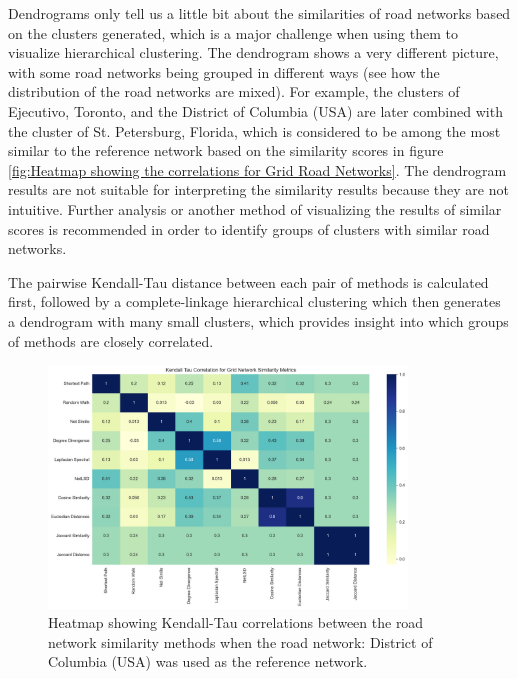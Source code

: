 Dendrograms only tell us a little bit about the similarities of road networks based on the clusters generated, which is a major challenge when using them to visualize hierarchical clustering. The dendrogram shows a very different picture, with some road networks being grouped in different ways (see how the distribution of the road networks are mixed). For example, the clusters of Ejecutivo, Toronto, and the District of Columbia (USA) are later combined with the cluster of St. Petersburg, Florida, which is considered to be among the most similar to the reference network based on the similarity scores in figure \ref{fig:Heatmap showing the correlations for Grid Road Networks}. The dendrogram results are not suitable for interpreting the similarity results because they are not intuitive. Further analysis or another method of visualizing the results of similar scores is recommended in order to identify groups of clusters with similar road networks.

The pairwise Kendall-Tau distance between each pair of methods is calculated first, followed by a complete-linkage hierarchical clustering which then generates a dendrogram with many small clusters, which provides insight into which groups of methods are closely correlated.

\begin{figure}[!ht]
\centering
\includegraphics[width=0.85\textwidth,center]{picture/Grid/grid2.png}
\caption[Heatmap showing Kendall-Tau correlations between the road network similarity methods for Grid Road Networks]{Heatmap showing Kendall-Tau correlations between the road network similarity methods when the road network: District of Columbia (USA) was used as the reference network.}
\label{fig:network ranking grid}
\end{figure}


